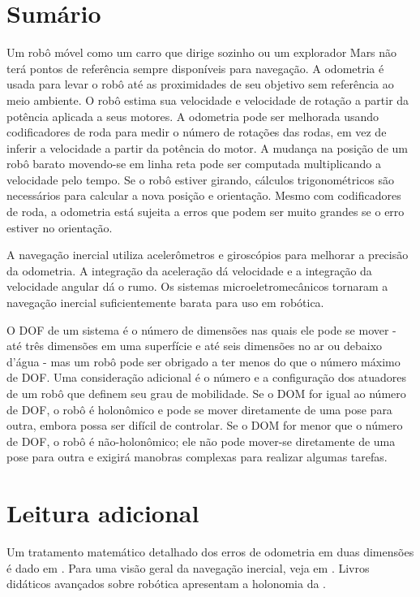 \section{Sumário}

Um robô móvel como um carro que dirige sozinho ou um explorador Mars não terá pontos de referência sempre disponíveis para navegação. A odometria é usada para levar o robô até as proximidades de seu objetivo sem referência ao meio ambiente. O robô estima sua velocidade e velocidade de rotação a partir da potência aplicada a seus motores. A odometria pode ser melhorada usando codificadores de roda para medir o número de rotações das rodas, em vez de inferir a velocidade a partir da potência do motor. A mudança na posição de um robô barato movendo-se em linha reta pode ser computada multiplicando a velocidade pelo tempo. Se o robô estiver girando, cálculos trigonométricos são necessários para calcular a nova posição e orientação. Mesmo com codificadores de roda, a odometria está sujeita a erros que podem ser muito grandes se o erro estiver no orientação.

A navegação inercial utiliza acelerômetros e giroscópios para melhorar a precisão da odometria. A integração da aceleração dá velocidade e a integração da velocidade angular dá o rumo. Os sistemas microeletromecânicos tornaram a navegação inercial suficientemente barata para uso em robótica.

O DOF de um sistema é o número de dimensões nas quais ele pode se mover - até três dimensões em uma superfície e até seis dimensões no ar ou debaixo d'água - mas um robô pode ser obrigado a ter menos do que o número máximo de DOF. Uma consideração adicional é o número e a configuração dos atuadores de um robô que definem seu grau de mobilidade. Se o DOM for igual ao número de DOF, o robô é holonômico e pode se mover diretamente de uma pose para outra, embora possa ser difícil de controlar. Se o DOM for menor que o número de DOF, o robô é não-holonômico; ele não pode mover-se diretamente de uma pose para outra e exigirá manobras complexas para realizar algumas tarefas.

\section{Leitura adicional}

Um tratamento matemático detalhado dos erros de odometria em duas dimensões é dado em \cite[Sect.~5.24]{siegwart}. Para uma visão geral da navegação inercial, veja em \cite{king,oxford}. Livros didáticos avançados sobre robótica apresentam a holonomia da \cite{correll,craig,siegwart,spong}.
